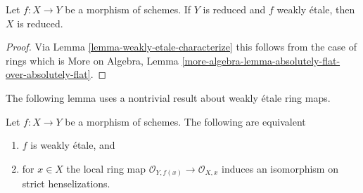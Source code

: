 \begin{lemma}
\label{lemma-reduced-goes-up}
Let $f : X \to Y$ be a morphism of schemes.
If $Y$ is reduced and $f$ weakly \'etale, then $X$ is reduced.
\end{lemma}

\begin{proof}
Via Lemma \ref{lemma-weakly-etale-characterize}
this follows from the case of rings which is
More on Algebra, Lemma
\ref{more-algebra-lemma-absolutely-flat-over-absolutely-flat}.
\end{proof}

\noindent
The following lemma uses a nontrivial result about weakly
\'etale ring maps.

\begin{lemma}
\label{lemma-weakly-etale-strictly-henselian-local-rings}
Let $f : X \to Y$ be a morphism of schemes.
The following are equivalent
\begin{enumerate}
\item $f$ is weakly \'etale, and
\item for $x \in X$ the local ring map
$\mathcal{O}_{Y, f(x)} \to \mathcal{O}_{X, x}$ induces an isomorphism
on strict henselizations.
\end{enumerate}
\end{lemma}

